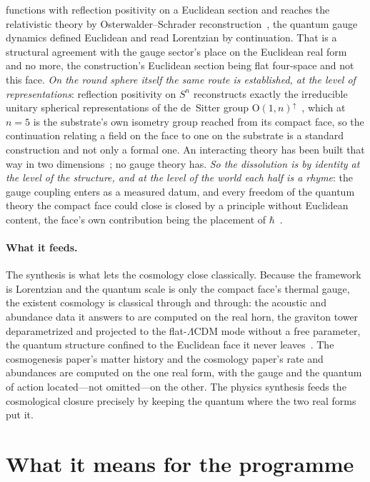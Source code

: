 \documentclass[11pt]{article}
\theoremstyle{plain}
\theoremstyle{remark}
\begin{document}
functions with reflection positivity on a Euclidean section and reaches the relativistic theory by Osterwalder--Schrader reconstruction~\cite{OsterwalderSchrader1973,YMGroup2026}, the quantum gauge dynamics defined Euclidean and read Lorentzian by continuation. That is a structural agreement with the gauge sector's place on the Euclidean real form and no more, the construction's Euclidean section being flat four-space and not this face. \emph{On the round sphere itself the same route is established, at the level of representations}: reflection positivity on $S^{n}$ reconstructs exactly the irreducible unitary spherical representations of the de~Sitter group $\mathrm{O}(1,n)^{\uparrow}$~\cite{NeebOlafsson2020}, which at $n=5$ is the substrate's own isometry group reached from its compact face, so the continuation relating a field on the face to one on the substrate is a standard construction and not only a formal one. An interacting theory has been built that way in two dimensions~\cite{FigariHoeghKrohnNappi1975,BarataJakelMund2023}; no gauge theory has. \emph{So the dissolution is by identity at the level of the structure, and at the level of the world each half is a rhyme}: the gauge coupling enters as a measured datum, and every freedom of the quantum theory the compact face could close is closed by a principle without Euclidean content, the face's own contribution being the placement of $\hbar$~\cite{JanzenCRframework}.

\paragraph{What it feeds.} The synthesis is what lets the cosmology close classically. Because the framework is Lorentzian and the quantum scale is only the compact face's thermal gauge, the existent cosmology is classical through and through: the acoustic and abundance data it answers to are computed on the real horn, the graviton tower deparametrized and projected to the flat-$\Lambda$CDM mode without a free parameter, the quantum structure confined to the Euclidean face it never leaves~\cite{JanzenCRcosmology,JanzenCosmogenesis}. The cosmogenesis paper's matter history and the cosmology paper's rate and abundances are computed on the one real form, with the gauge and the quantum of action located---not omitted---on the other. The physics synthesis feeds the cosmological closure precisely by keeping the quantum where the two real forms put it.

\section{What it means for the programme}\label{sec:meaning}
\end{document}
